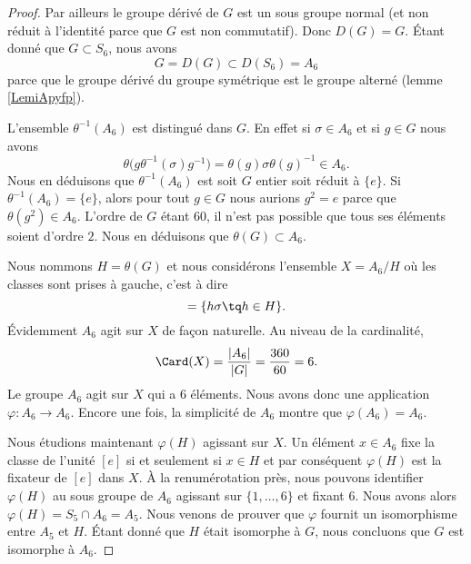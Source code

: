 \begin{proof}
    Par ailleurs le groupe dérivé de \( G\) est un sous groupe normal (et non réduit à l'identité parce que \( G\) est non commutatif). Donc \( D(G)=G\). Étant donné que \( G\subset S_6\), nous avons
    \begin{equation}
        G=D(G)\subset D(S_6)=A_6
    \end{equation}
    parce que le groupe dérivé du groupe symétrique est le groupe alterné (lemme \ref{LemiApyfp}).

    L'ensemble \( \theta^{-1}(A_6)\) est distingué dans \( G\). En effet si \( \sigma\in A_6\) et si \( g\in G\) nous avons
    \begin{equation}
        \theta\big( g\theta^{-1}(\sigma)g^{-1} \big)=\theta(g)\sigma \theta(g)^{-1}\in A_6.
    \end{equation}
    Nous en déduisons que \( \theta^{-1}(A_6)\) est soit \( G\) entier soit réduit à \( \{ e \}\). Si \( \theta^{-1}(A_6)=\{ e \}\), alors pour tout \( g\in G\) nous aurions \( g^2=e\) parce que \( \theta(g^2)\in A_6\). L'ordre de \( G\) étant \( 60\), il n'est pas possible que tous ses éléments soient d'ordre \( 2\). Nous en déduisons que \( \theta(G)\subset A_6\).

    Nous nommons \( H=\theta(G)\) et nous considérons l'ensemble \( X=A_6/H\) où les classes sont prises à gauche, c'est à dire 
    \begin{equation}
        [\sigma]=\{ h\sigma\tq h\in H \}.
    \end{equation}
    Évidemment \( A_6\) agit sur \( X\) de façon naturelle. Au niveau de la cardinalité,
    \begin{equation}
        \Card(X)=\frac{ | A_6 | }{ | G | }=\frac{ 360 }{ 60 }=6.
    \end{equation}
    Le groupe \( A_6\) agit sur \( X\) qui a \( 6\) éléments. Nous avons donc une application \( \varphi\colon A_6\to A_6\). Encore une fois, la simplicité de \( A_6\) montre que \( \varphi(A_6)=A_6\).

    Nous étudions maintenant \( \varphi(H)\) agissant sur \( X\). Un élément \( x\in A_6\) fixe la classe de l'unité \( [e]\) si et seulement si \( x\in H\) et par conséquent \( \varphi(H)\) est la fixateur de \( [e]\) dans \( X\). À la renumérotation près, nous pouvons identifier \( \varphi(H)\) au sous groupe de \( A_6\) agissant sur \( \{ 1,\ldots, 6 \}\) et fixant \( 6\). Nous avons alors \( \varphi(H)=S_5\cap A_6=A_5\). Nous venons de prouver que \( \varphi\) fournit un isomorphisme entre \( A_5\) et \( H\). Étant donné que \( H\) était isomorphe à \( G\), nous concluons que \( G\) est isomorphe à \( A_6\).
\end{proof}

